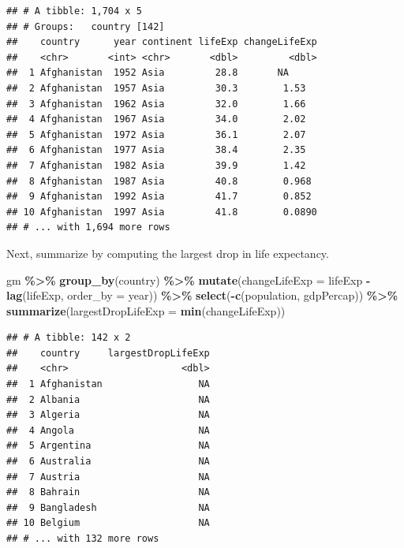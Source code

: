 \documentclass[
]{krantz}
\newenvironment{Shaded}{\begin{snugshade}}{\end{snugshade}}
\newcommand{\DataTypeTok}[1]{\textcolor[rgb]{0.13,0.29,0.53}{#1}}
\newcommand{\KeywordTok}[1]{\textcolor[rgb]{0.13,0.29,0.53}{\textbf{#1}}}
\newcommand{\NormalTok}[1]{#1}
\newcommand{\OperatorTok}[1]{\textcolor[rgb]{0.81,0.36,0.00}{\textbf{#1}}}
\newcommand{\StringTok}[1]{\textcolor[rgb]{0.31,0.60,0.02}{#1}}
\begin{document}
\begin{verbatim}
## # A tibble: 1,704 x 5
## # Groups:   country [142]
##    country      year continent lifeExp changeLifeExp
##    <chr>       <int> <chr>       <dbl>         <dbl>
##  1 Afghanistan  1952 Asia         28.8       NA     
##  2 Afghanistan  1957 Asia         30.3        1.53  
##  3 Afghanistan  1962 Asia         32.0        1.66  
##  4 Afghanistan  1967 Asia         34.0        2.02  
##  5 Afghanistan  1972 Asia         36.1        2.07  
##  6 Afghanistan  1977 Asia         38.4        2.35  
##  7 Afghanistan  1982 Asia         39.9        1.42  
##  8 Afghanistan  1987 Asia         40.8        0.968 
##  9 Afghanistan  1992 Asia         41.7        0.852 
## 10 Afghanistan  1997 Asia         41.8        0.0890
## # ... with 1,694 more rows
\end{verbatim}

Next, summarize by computing the largest drop in life expectancy.

\begin{Shaded}
\begin{Highlighting}[]
\NormalTok{gm }\OperatorTok{\%\textgreater{}\%}\StringTok{ }
\StringTok{  }\KeywordTok{group\_by}\NormalTok{(country) }\OperatorTok{\%\textgreater{}\%}\StringTok{ }
\StringTok{  }\KeywordTok{mutate}\NormalTok{(}\DataTypeTok{changeLifeExp =}\NormalTok{ lifeExp }\OperatorTok{{-}}\StringTok{ }\KeywordTok{lag}\NormalTok{(lifeExp, }\DataTypeTok{order\_by =}\NormalTok{ year)) }\OperatorTok{\%\textgreater{}\%}\StringTok{ }
\StringTok{  }\KeywordTok{select}\NormalTok{(}\OperatorTok{{-}}\KeywordTok{c}\NormalTok{(population, gdpPercap)) }\OperatorTok{\%\textgreater{}\%}\StringTok{ }
\StringTok{  }\KeywordTok{summarize}\NormalTok{(}\DataTypeTok{largestDropLifeExp =} \KeywordTok{min}\NormalTok{(changeLifeExp))}
\end{Highlighting}
\end{Shaded}

\begin{verbatim}
## # A tibble: 142 x 2
##    country     largestDropLifeExp
##    <chr>                    <dbl>
##  1 Afghanistan                 NA
##  2 Albania                     NA
##  3 Algeria                     NA
##  4 Angola                      NA
##  5 Argentina                   NA
##  6 Australia                   NA
##  7 Austria                     NA
##  8 Bahrain                     NA
##  9 Bangladesh                  NA
## 10 Belgium                     NA
## # ... with 132 more rows
\end{verbatim}
\end{document}
